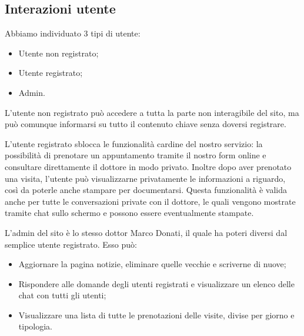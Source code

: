 \subsection{Interazioni utente}

Abbiamo individuato 3 tipi di utente:
\begin{itemize}
\item Utente non registrato;
\item Utente registrato;
\item Admin.
\end{itemize}

L’utente non registrato può accedere a tutta la parte non interagibile del sito, ma può comunque informarsi su tutto il contenuto chiave senza doversi registrare.

L’utente registrato sblocca le funzionalità cardine del nostro servizio: la possibilità di prenotare un appuntamento tramite il nostro form online e consultare direttamente il dottore in modo privato.
Inoltre dopo aver prenotato una visita, l’utente può visualizzarne privatamente le informazioni a riguardo, così da poterle anche stampare per documentarsi.
Questa funzionalità è valida anche per tutte le conversazioni private con il dottore, le quali vengono mostrate tramite chat sullo schermo e possono essere eventualmente stampate.

L’admin del sito è lo stesso dottor Marco Donati, il quale ha poteri diversi dal semplice utente registrato. Esso può:

\begin{itemize}
\item Aggiornare la pagina notizie, eliminare quelle vecchie e scriverne di nuove;
\item Rispondere alle domande degli utenti registrati e visualizzare un elenco delle chat con tutti gli utenti;
\item Visualizzare una lista di tutte le prenotazioni delle visite, divise per giorno e tipologia.
\end{itemize}


